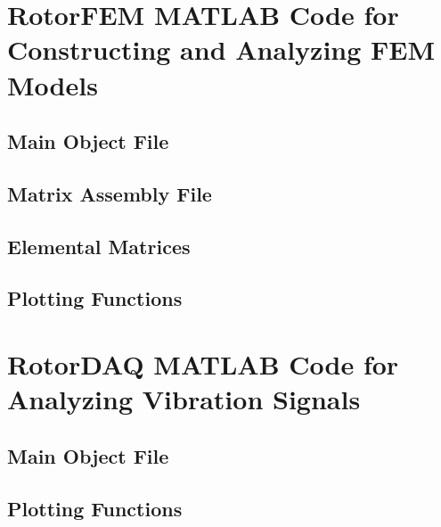 
\chapter{RotorFEM MATLAB Code for Constructing and Analyzing FEM Models}
\section{Main Object File}

\section{Matrix Assembly File}

\section{Elemental Matrices}



\section{Plotting Functions}






\chapter{RotorDAQ MATLAB Code for Analyzing Vibration Signals}
\section{Main Object File}

\section{Plotting Functions}



